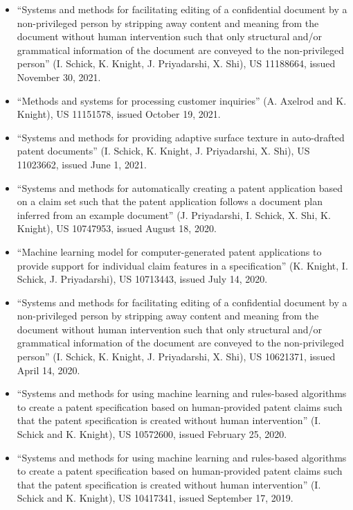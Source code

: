 {}

\begin{itemize}
\item ``Systems and methods for facilitating editing of a confidential document by a non-privileged person by stripping away content and meaning from the document without human intervention such that only structural and/or grammatical information of the document are conveyed to the non-privileged person'' (I. Schick, K. Knight, J. Priyadarshi, X. Shi), US 11188664, issued November 30, 2021.

\item ``Methods and systems for processing customer inquiries'' (A. Axelrod and K. Knight), US 11151578, issued October 19, 2021.

\item ``Systems and methods for providing adaptive surface texture in auto-drafted patent documents'' (I. Schick, K. Knight, J. Priyadarshi, X. Shi), US 11023662, issued June 1, 2021.

\item ``Systems and methods for automatically creating a patent application based on a claim set such that the patent application follows a document plan inferred from an example document'' (J. Priyadarshi, I. Schick, X. Shi, K. Knight), US 10747953, issued August 18, 2020.

\item ``Machine learning model for computer-generated patent applications to provide support for individual claim features in a specification'' (K. Knight, I. Schick, J. Priyadarshi), US 10713443, issued July 14, 2020.

\item ``Systems and methods for facilitating editing of a confidential document by a non-privileged person by stripping away content and meaning from the document without human intervention such that only structural and/or grammatical information of the document are conveyed to the non-privileged person'' (I. Schick, K. Knight, J. Priyadarshi, X. Shi), US 10621371, issued April 14, 2020.

\item ``Systems and methods for using machine learning and rules-based algorithms to create a patent specification based on human-provided patent claims such that the patent specification is created without human intervention'' (I. Schick and K. Knight), US 10572600, issued February 25, 2020.

\item ``Systems and methods for using machine learning and rules-based algorithms to create a patent specification based on human-provided patent claims such that the patent specification is created without human intervention'' (I. Schick and K. Knight), US 10417341, issued September 17, 2019.


\end{itemize}
